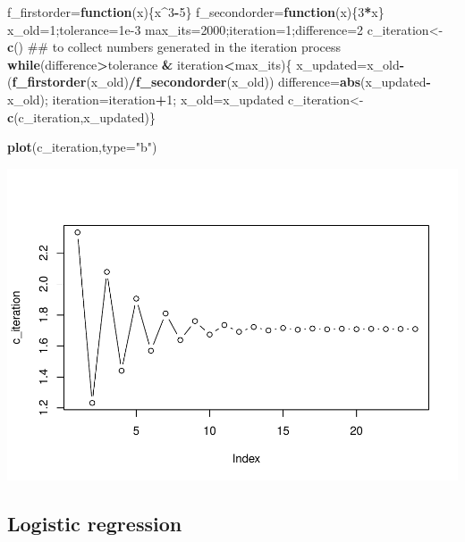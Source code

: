 \documentclass[]{book}
\newenvironment{Shaded}{\begin{snugshade}}{\end{snugshade}}
\newcommand{\KeywordTok}[1]{\textcolor[rgb]{0.13,0.29,0.53}{\textbf{#1}}}
\newcommand{\DataTypeTok}[1]{\textcolor[rgb]{0.13,0.29,0.53}{#1}}
\newcommand{\DecValTok}[1]{\textcolor[rgb]{0.00,0.00,0.81}{#1}}
\newcommand{\FloatTok}[1]{\textcolor[rgb]{0.00,0.00,0.81}{#1}}
\newcommand{\StringTok}[1]{\textcolor[rgb]{0.31,0.60,0.02}{#1}}
\newcommand{\ControlFlowTok}[1]{\textcolor[rgb]{0.13,0.29,0.53}{\textbf{#1}}}
\newcommand{\OperatorTok}[1]{\textcolor[rgb]{0.81,0.36,0.00}{\textbf{#1}}}
\newcommand{\NormalTok}[1]{#1}
\begin{document}
\begin{Shaded}
\begin{Highlighting}[]
\NormalTok{f_firstorder=}\ControlFlowTok{function}\NormalTok{(x)\{x}\OperatorTok{^}\DecValTok{3}\OperatorTok{-}\DecValTok{5}\NormalTok{\}}
\NormalTok{f_secondorder=}\ControlFlowTok{function}\NormalTok{(x)\{}\DecValTok{3}\OperatorTok{*}\NormalTok{x\}}
\NormalTok{x_old=}\DecValTok{1}\NormalTok{;tolerance=}\FloatTok{1e-3}
\NormalTok{max_its=}\DecValTok{2000}\NormalTok{;iteration=}\DecValTok{1}\NormalTok{;difference=}\DecValTok{2}
\NormalTok{c_iteration<-}\KeywordTok{c}\NormalTok{() ## to collect numbers generated in the iteration process }
\ControlFlowTok{while}\NormalTok{(difference}\OperatorTok{>}\NormalTok{tolerance }\OperatorTok{&}\StringTok{ }\NormalTok{iteration}\OperatorTok{<}\NormalTok{max_its)\{}
\NormalTok{  x_updated=x_old}\OperatorTok{-}\NormalTok{(}\KeywordTok{f_firstorder}\NormalTok{(x_old)}\OperatorTok{/}\KeywordTok{f_secondorder}\NormalTok{(x_old))}
\NormalTok{  difference=}\KeywordTok{abs}\NormalTok{(x_updated}\OperatorTok{-}\NormalTok{x_old);}
\NormalTok{  iteration=iteration}\OperatorTok{+}\DecValTok{1}\NormalTok{;}
\NormalTok{  x_old=x_updated}
\NormalTok{  c_iteration<-}\KeywordTok{c}\NormalTok{(c_iteration,x_updated)\}}

\KeywordTok{plot}\NormalTok{(c_iteration,}\DataTypeTok{type=}\StringTok{"b"}\NormalTok{)}
\end{Highlighting}
\end{Shaded}

\includegraphics{bookdown-demo_files/figure-latex/unnamed-chunk-23-1.pdf}

\subsection{Logistic regression}\label{logistic-regression}
\end{document}

